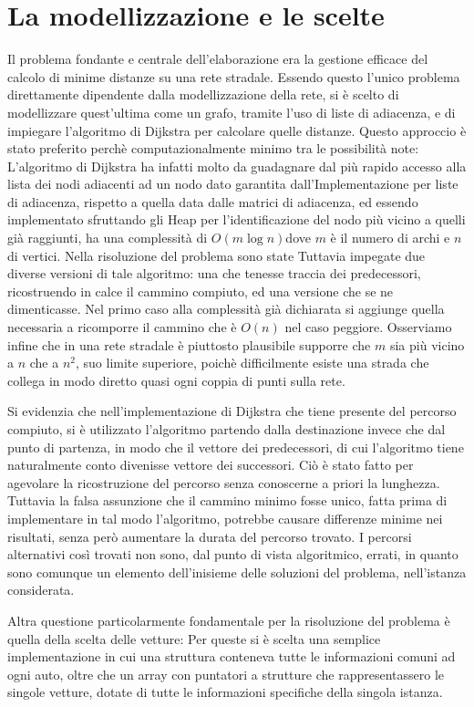 \documentclass[a4paper,11pt]{Article}
\begin{document}
\section{La modellizzazione e le scelte}
Il problema fondante e centrale dell'elaborazione era la gestione efficace del calcolo di minime distanze su una rete stradale. Essendo questo l'unico problema direttamente dipendente dalla modellizzazione della rete, si è scelto di modellizzare quest'ultima come un grafo, tramite l'uso di liste di adiacenza, e di impiegare l'algoritmo di Dijkstra per calcolare quelle distanze. Questo approccio è stato preferito perchè computazionalmente minimo tra le possibilità note: L'algoritmo di Dijkstra ha infatti molto da guadagnare dal più rapido accesso alla lista dei nodi adiacenti ad un nodo dato garantita dall'Implementazione per liste di adiacenza, rispetto a quella data dalle matrici di adiacenza, ed essendo implementato sfruttando gli Heap per l'identificazione del nodo più vicino a quelli già raggiunti, ha una complessità di $O(m\log{}n)$dove $m$ è il numero di archi e $n$ di vertici.
Nella risoluzione del problema sono state Tuttavia impegate due diverse versioni di tale algoritmo: una che tenesse traccia dei predecessori, ricostruendo in calce il cammino compiuto, ed una versione che se ne dimenticasse.
Nel primo caso alla complessità già dichiarata si aggiunge quella necessaria a ricomporre il cammino che è $O(n)$ nel caso peggiore.
Osserviamo infine che in una rete stradale è piuttosto plausibile supporre che $m$ sia più vicino a $n$ che a $n^2$, suo limite superiore, poichè difficilmente esiste una strada che collega in modo diretto quasi ogni coppia di punti sulla rete.

Si evidenzia che nell'implementazione di Dijkstra che tiene presente del percorso compiuto, si è utilizzato l'algoritmo partendo dalla destinazione invece che dal punto di partenza, in modo che il vettore dei predecessori, di cui l'algoritmo tiene naturalmente conto divenisse vettore dei successori. Ciò è stato fatto per agevolare la ricostruzione del percorso senza conoscerne a priori la lunghezza.
Tuttavia la falsa assunzione che il cammino minimo fosse unico, fatta prima di implementare in tal modo l'algoritmo, potrebbe causare differenze minime nei risultati, senza però aumentare la durata del percorso trovato. I percorsi alternativi così trovati non sono, dal punto di vista algoritmico, errati, in quanto sono comunque un elemento dell'inisieme delle soluzioni del problema, nell'istanza considerata.

Altra questione particolarmente fondamentale per la risoluzione del problema è quella della scelta delle vetture: Per queste si è scelta una semplice implementazione in cui una struttura conteneva tutte le informazioni comuni ad ogni auto, oltre che un array con puntatori a strutture che rappresentassero le singole vetture, dotate di tutte le informazioni specifiche della singola istanza.
\end{document}
